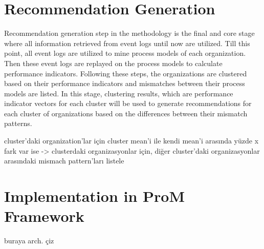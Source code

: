 \section{Recommendation Generation}
\label{sec:recommendation-generation}
Recommendation generation step in the methodology is the final and core stage where all information retrieved from event logs until now are utilized. Till this point, all event logs are utilized to mine process models of each organization. Then these event logs are replayed on the process models to calculate performance indicators. Following these steps, the organizations are clustered based on their performance indicators and mismatches between their process models are listed. In this stage, clustering results, which are performance indicator vectors for each cluster will be used to generate recommendations for each cluster of organizations based on the differences between their mismatch patterns.

cluster'daki organization'lar için cluster mean'i ile kendi mean'i arasında yüzde x fark var ise
-> clusterdaki organizasyonlar için, diğer cluster'daki organizasyonlar arasındaki mismach pattern'ları listele


\section{Implementation in ProM Framework}
\label{sec:implementation}
buraya arch. çiz